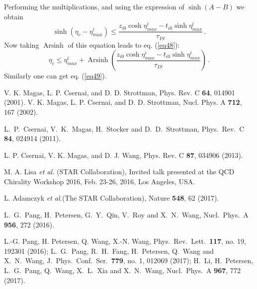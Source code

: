 \documentclass[aps,prc,twocolumn,floatfix,showpacs,a4paper,
nofootinbib,amsmath,amssymb]{revtex4-1}
\newcommand{\be}{\begin{equation}}
\newcommand{\ee}{\end{equation}}
\DeclareMathOperator{\Arsinh}{Arsinh}
\begin{document}
Performing the multiplications, and using the expression 
of $\sinh(A-B)$ we obtain
\be
\sinh(\eta_c - \eta_{max}^{i}) \le \frac
{z_{i0} \cosh \eta_{max}^{i} - t_{i0} \sinh \eta_{max}^{i}}{\tau_{IS}}\,.
\ee
Now taking $\Arsinh$ of this equation leads to eq. (\ref{eq48}):
$$
\eta_c  \le \eta_{max}^{i} + \Arsinh \left(\frac
{z_{i0} \cosh \eta_{max}^{i} - t_{i0} \sinh \eta_{max}^{i}}{\tau_{IS}}
\right) \,.
$$
Similarly one can get eq. (\ref{eq49}).


\begin{thebibliography}{99}

  V. K. Magas, L. P. Csernai, and D. D.
  Strottman, Phys. Rev. C {\bf 64}, 014901 (2001).
  V. K. Magas, L. P. Csernai, and D. D. 
  Strottman, Nucl. Phys. A {\bf 712}, 167 (2002).

  L.~P.~Csernai, V.~K.~Magas, H.~Stocker and D.~D.~Strottman,
  Phys.\ Rev.\ C {\bf 84}, 024914 (2011).

L. P. Csernai, V. K. Magas, and  D. J. Wang,
Phys. Rev. C {\bf 87}, 034906 (2013).

M. A. Lisa {\it et al.} (STAR Collaboration),
Invited talk presented at the
QCD Chirality Workshop 2016, Feb. 23-26, 2016, Los Angeles, USA.

L. Adamczyk {\it et al.}(The STAR Collaboration), 
Nature {\bf 548}, 62 (2017).


  L.~G.~Pang, H.~Petersen, G.~Y.~Qin, V.~Roy and X.~N.~Wang,
  Nucl.\ Phys.\ A {\bf 956}, 272 (2016).


L.-G. Pang, H. Petersen, Q. Wang, X.-N. Wang,
  Phys.\ Rev.\ Lett.\  {\bf 117}, no. 19, 192301 (2016);
  L.~G.~Pang, R.~H.~Fang, H.~Petersen, Q.~Wang and X.~N.~Wang,
  J.\ Phys.\ Conf.\ Ser.\  {\bf 779}, no. 1, 012069 (2017);
  H.~Li, H.~Petersen, L.~G.~Pang, Q.~Wang, X.~L.~Xia and X.~N.~Wang,
  Nucl.\ Phys.\ A {\bf 967}, 772 (2017).
  

\end{thebibliography}
\end{document}
